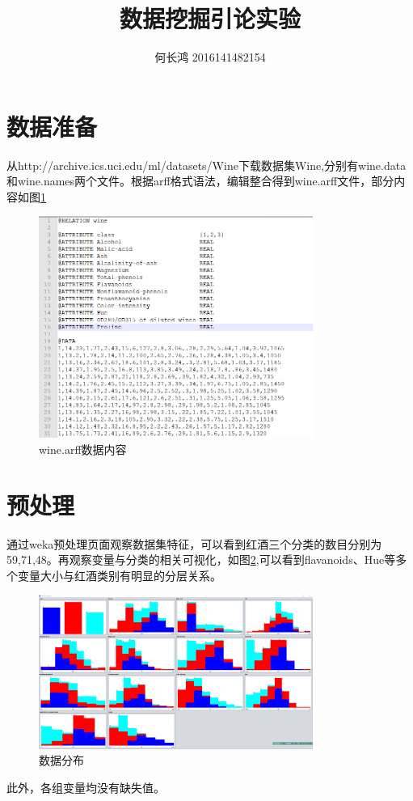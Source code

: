 \documentclass{xcumcmart}
\title{数据挖掘引论实验}
\author{何长鸿 2016141482154}
\begin{document}
\renewcommand\arraystretch{2}
\maketitle
\section{数据准备}
\par 从http://archive.ics.uci.edu/ml/datasets/Wine下载数据集Wine,分别有wine.data和wine.names两个文件。根据arff格式语法，编辑整合得到wine.arff文件，部分内容如图\ref{fig:fg1}

\begin{figure}[htbp]
	\centering
	\includegraphics[width=0.8\textwidth]{fig/data.png}
    \caption{wine.arff数据内容\label{fig:fg1}}
\end{figure}

\section{预处理}
通过weka预处理页面观察数据集特征，可以看到红酒三个分类的数目分别为59,71,48。再观察变量与分类的相关可视化，如图\ref{fig:fg2},可以看到flavanoids、Hue等多个变量大小与红酒类别有明显的分层关系。
\begin{figure}[htbp]
	\centering
	\includegraphics[width=0.8\textwidth]{fig/vis_data.png}
    \caption{数据分布\label{fig:fg2}}
\end{figure}
此外，各组变量均没有缺失值。
\end{document}
